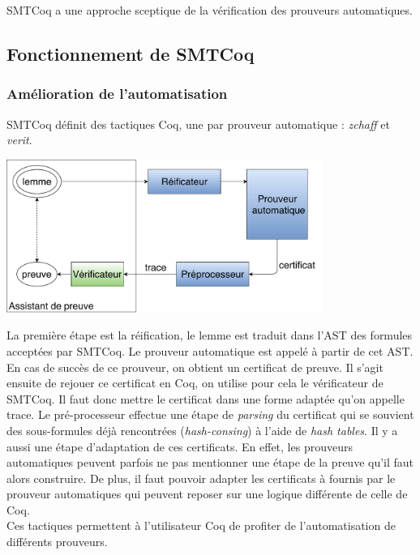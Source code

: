 \documentclass[11pt]{article}
\begin{document}
SMTCoq a une approche sceptique de la vérification des prouveurs automatiques.

\subsection{Fonctionnement de SMTCoq}

\subsubsection{Amélioration de l'automatisation}

SMTCoq définit des tactiques Coq, une par prouveur automatique : \textit{zchaff} et \textit{verit}. \\


\begin{center}
    \includegraphics[height=5cm]{Automatisation.pdf}
\end{center}

La première étape est la réification, le lemme est traduit dans l'AST des formules acceptées par SMTCoq. Le prouveur automatique est appelé à partir de cet AST. En cas de succès de ce prouveur, on obtient un certificat de preuve. 
Il s'agit ensuite de rejouer ce certificat en Coq, on utilise pour cela le vérificateur de SMTCoq. Il faut donc mettre le certificat dans une forme adaptée qu'on appelle trace. Le pré-processeur effectue une étape de \textit{parsing} du certificat qui se souvient des sous-formules déjà rencontrées (\textit{hash-consing}) à l'aide de \textit{hash tables}.  Il y a aussi une étape d'adaptation de ces certificats. En effet, les prouveurs automatiques peuvent parfois ne pas mentionner une étape de la preuve qu'il faut alors construire. De plus, il faut pouvoir adapter les certificats à fournis par le prouveur automatiques qui peuvent reposer sur une logique différente de celle de Coq. \\

Ces tactiques permettent à l'utilisateur Coq de profiter de l'automatisation de différents prouveurs.\\
\end{document}
